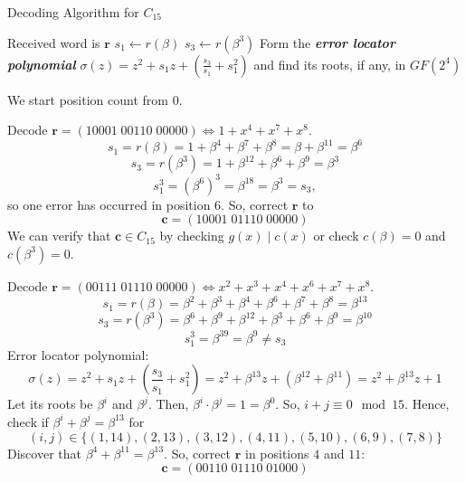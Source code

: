 \begin{algbox}
    \begin{algorithm}[H]
        \DontPrintSemicolon
        \caption{Decoding Algorithm for $ C_{15} $}
        Received word is $ \bm{r} $\;
        $ s_1\gets r(\beta) $\;
        $ s_3\gets r(\beta^3) $\;
         {
        }
         {
         {
        }
        }
         {
            \Return
        }
        Form the \textbf\emph{{error locator polynomial}}
        $ \sigma(z)=z^2+s_1z+\left( \frac{s_3}{s_1} +s_1^2 \right) $ and find its
        roots, if any, in $ GF(2^4) $\;
         {
        }
        \Return
    \end{algorithm}
\end{algbox}

\begin{remark}
    We start position count from $ 0 $.
\end{remark}

\begin{exbox}
    \begin{example}[Decoding $ C_{15} $]
        Decode $ \bm{r}=(10001\; 00110\; 00000)\iff 1+x^4+x^7+x^8 $.
        \[ s_1=r(\beta)=1+\beta^4+\beta^7+\beta^8=\beta+\beta^{11}=\beta^6 \]
        \[ s_3=r(\beta^3)=1+\beta^{12}+\beta^{6}+\beta^9=\beta^3 \]
        \[ s_1^3=(\beta^6)^3=\beta^{18}=\beta^3=s_3, \]
        so one error has occurred in position $ 6 $. So, correct $ \bm{r} $ to
        \[ \bm{c}=(10001\; 01110\; 00000) \]
        We can verify that $ \bm{c}\in C_{15} $ by checking $ g(x)\mid c(x) $
        or check $ c(\beta)=0 $ and $ c(\beta^3)=0 $.
    \end{example}
\end{exbox}

\begin{exbox}
    \begin{example}[Decoding $ C_{15} $]
        Decode $ \bm{r}=(00111\; 01110\; 00000)\iff x^2+x^3+x^4+x^6+x^7+x^8 $.
        \[ s_1=r(\beta)=\beta^2+\beta^3+\beta^4+\beta^6+\beta^7+\beta^8=\beta^{13} \]
        \[ s_3=r(\beta^3)=\beta^6+\beta^9+\beta^{12}+\beta^3+\beta^6+\beta^9=\beta^{10} \]
        \[ s_1^3=\beta^{39}=\beta^9\neq s_3 \]
        Error locator polynomial:
        \[ \sigma(z)=z^2+s_1z+\left(\frac{s_3}{s_1}+s_1^2 \right)
            =z^2+\beta^{13}z+(\beta^{12}+\beta^{11})=z^2+\beta^{13}z+1 \]
        Let its roots be $ \beta^i $ and $ \beta^j $. Then, $ \beta^i\cdot \beta^j=1=
            \beta^0 $. So, $ i+j\equiv 0\mod 15 $. Hence, check if $ \beta^i+\beta^j=\beta^{13} $
        for
        \[ (i,j)\in \{(1,14),(2,13),(3,12),(4,11),(5,10),(6,9),(7,8)\} \]
        Discover that $ \beta^4+\beta^{11}=\beta^{13} $. So, correct $ \bm{r} $
        in positions $ 4 $ and $ 11 $:
        \[ \bm{c}=(00110\; 01110\; 01000) \]
    \end{example}
\end{exbox}

